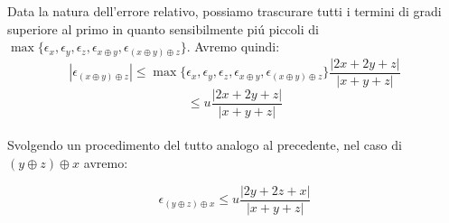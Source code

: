 \noindent Data la natura dell'errore relativo, possiamo trascurare tutti i termini di gradi superiore al primo in quanto sensibilmente pi\'u piccoli di \(\max \{\epsilon_x, \epsilon_y, \epsilon_z, \epsilon_{x \oplus y}, \epsilon_{(x \oplus y) \oplus z}\} \). Avremo quindi:
\[
|\epsilon_{(x \oplus y) \oplus z }| \leq \max \{\epsilon_x, \epsilon_y, \epsilon_z, \epsilon_{x \oplus y}, \epsilon_{(x \oplus y) \oplus z}\} \frac{|2x + 2y + z|}{|x+y+z|}
\]
\[
\leq u \frac{|2x + 2y + z|}{|x+y+z|}
\]
\\
\noindent Svolgendo un procedimento del tutto analogo al precedente, nel caso di \((y \oplus z) \oplus x \) avremo:

\[
\epsilon_{(y \oplus z) \oplus x } \leq u \frac{|2y + 2z + x|}{|x+y+z|}
\]
